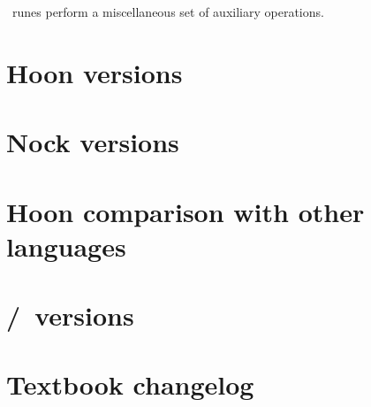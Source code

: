 \zap~runes perform a miscellaneous set of auxiliary operations.

\section{Hoon versions}


\section{Nock versions}

\section{Hoon comparison with other languages}

\section{\zuse/\lull~versions}

\section{Textbook changelog}

